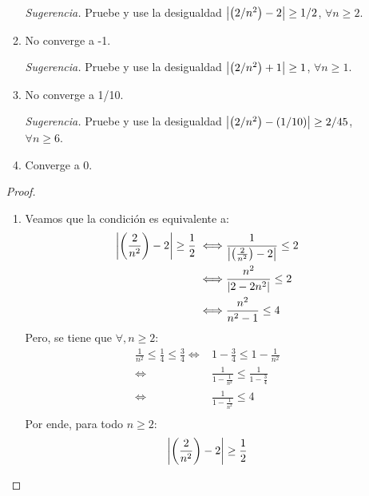 \documentclass[12pt]{article}
\begin{document}
\begin{enumerate}
\begin{enumerate}
                \textit{Sugerencia.} Pruebe y use la desigualdad $\left| \left(2/n^2\right)-2 \right|\geq 1/2$, $\forall n\geq2$.
            \item No converge a -1.
                
                \textit{Sugerencia.} Pruebe y use la desigualdad $\left| \left(2/n^2\right)+1 \right|\geq 1$, $\forall n\geq1$.
            \item No converge a 1/10.
                
                \textit{Sugerencia.} Pruebe y use la desigualdad $\left| \left(2/n^2\right)-\left(1/10\right) \right|\geq 2/45$, $\forall n\geq6$.
            \item Converge a 0.
        \end{enumerate}
        \begin{proof}
            \begin{enumerate}
                \item Veamos que la condición es equivalente a:
                \begin{equation*}
                    \begin{split}
                        \left| \left(\frac{2}{n^2}\right)-2 \right|\geq \frac{1}{2}\iff& \frac{1}{\left| \left(\frac{2}{n^2}\right)-2 \right|}\leq 2\\
                        \iff& \frac{n^2}{\left| 2-2n^2 \right|}\leq 2\\
                        \iff& \frac{n^2}{n^2-1}\leq 4\\
                    \end{split}
                \end{equation*}
                Pero, se tiene que $\forall, n\geq2$:
                \begin{equation*}
                    \begin{split}
                        \frac{1}{n^2}\leq \frac{1}{4}\leq \frac{3}{4}\iff& 1-\frac{3}{4}\leq 1-\frac{1}{n^2}\\
                        \iff& \frac{1}{1-\frac{1}{n^2}}\leq \frac{1}{1-\frac{3}{4}}\\
                        \iff& \frac{1}{1-\frac{1}{n^2}}\leq 4\\
                    \end{split}
                \end{equation*}
                Por ende, para todo $n\geq2$:
                \begin{equation*}
                    \left| \left(\frac{2}{n^2}\right)-2 \right|\geq\frac{1}{2}
                \end{equation*}

\end{enumerate}
\end{proof}
\end{enumerate}
\end{document}
